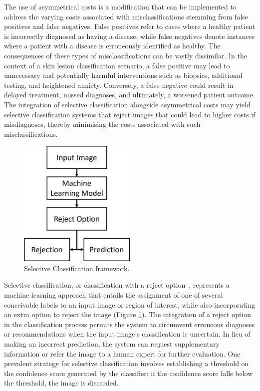 The use of asymmetrical costs is a modification that can be implemented to address the varying costs associated with misclassifications stemming from false positives and false negatives. False positives refer to cases where a healthy patient is incorrectly diagnosed as having a disease, while false negatives denote instances where a patient with a disease is erroneously identified as healthy. The consequences of these types of misclassifications can be vastly dissimilar. In the context of a skin lesion classification scenario, a false positive may lead to unnecessary and potentially harmful interventions such as biopsies, additional testing, and heightened anxiety. Conversely, a false negative could result in delayed treatment, missed diagnoses, and ultimately, a worsened patient outcome. The integration of selective classification alongside asymmetrical costs may yield selective classification systems that reject images that could lead to higher costs if misdiagnoses, thereby minimising the costs associated with such misclassifications.

\begin{figure}[h]
	\centering
	\includegraphics[width=0.5\textwidth]{images/selective_classification.png}
	\caption{Selective Classification framework.}
	\label{fig:selective_classification}
\end{figure}

Selective classification, or classification with a reject option~\citep{chow1957optimum}, represents a machine learning approach that entails the assignment of one of several conceivable labels to an input image or region of interest, while also incorporating an extra option to reject the image (Figure \ref{fig:selective_classification}). The integration of a reject option in the classification process permits the system to circumvent erroneous diagnoses or recommendations when the input image's classification is uncertain. In lieu of making an incorrect prediction, the system can request supplementary information or refer the image to a human expert for further evaluation. One prevalent strategy for selective classification involves establishing a threshold on the confidence score generated by the classifier; if the confidence score falls below the threshold, the image is discarded.




